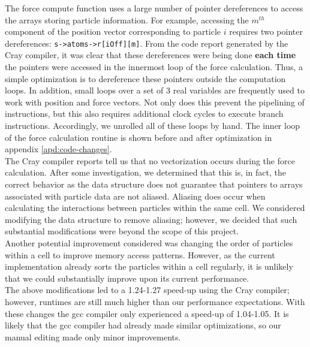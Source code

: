 \documentclass[12pt]{article}
\begin{document}
The force compute function uses a large number of pointer dereferences
to access the arrays storing particle information. For example,
accessing the $m^{th}$ component of the position vector corresponding
to particle $i$ requires two pointer dereferences:
\texttt{s->atoms->r[iOff][m]}. From the code report generated by the
Cray compiler, it was clear that these dereferences were being done
{\bf each time} the pointers were accessed in the innermost loop of
the force calculation.  Thus, a simple optimization is to dereference
these pointers outside the computation loops.  In addition, small
loops over a set of 3 real variables are frequently used to work with
position and force vectors. Not only does this prevent the pipelining
of instructions, but this also requires additional clock cycles to
execute branch instructions.  Accordingly, we unrolled all of these
loops by hand. The inner loop of the force calculation routine is
shown before and after optimization in appendix
\ref{apd:code-changes}.
\\

The Cray compiler reports tell us that no vectorization occurs during
the force calculation. After some investigation, we determined that
this is, in fact, the correct behavior as the data structure does not
guarantee that pointers to arrays associated with particle data are
not aliased.  Aliasing does occur when calculating the interactions
between particles within the same cell. We considered modifying the
data structure to remove aliasing; however, we decided that such
substantial modifications were beyond the scope of this project.
\\


 Another potential improvement considered was changing the order of
particles within a cell to improve memory access patterns. However, as the
current implementation already sorts the particles within a cell regularly, it is unlikely 
that we could substantially improve upon its current performance. \\

 The above modifications led to a 1.24-1.27 speed-up using
the Cray compiler; however, runtimes are still much higher than our
performance expectations. With these changes the gcc compiler only
experienced a speed-up of 1.04-1.05. It is likely that the gcc
compiler had already made similar optimizations, so our manual editing
made only minor improvements.
\end{document}
